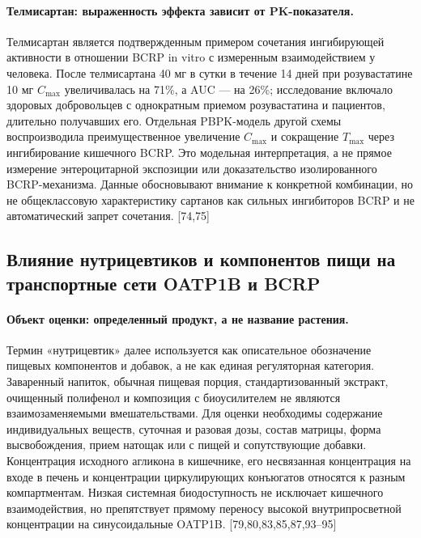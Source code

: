 \documentclass[11pt]{article}
\begin{document}
\paragraph{Телмисартан: выраженность эффекта зависит от PK-показателя.}
Телмисартан является подтвержденным примером сочетания ингибирующей активности в отношении BCRP in vitro с измеренным взаимодействием у человека. После телмисартана 40 мг в сутки в течение 14 дней при розувастатине 10 мг \(C_{\max}\) увеличивалась на 71\%, а AUC --- на 26\%; исследование включало здоровых добровольцев с однократным приемом розувастатина и пациентов, длительно получавших его. Отдельная PBPK-модель другой схемы воспроизводила преимущественное увеличение \(C_{\max}\) и сокращение \(T_{\max}\) через ингибирование кишечного BCRP. Это модельная интерпретация, а не прямое измерение энтероцитарной экспозиции или доказательство изолированного BCRP-механизма. Данные обосновывают внимание к конкретной комбинации, но не общеклассовую характеристику сартанов как сильных ингибиторов BCRP и не автоматический запрет сочетания. [74,75]

\subsection{Влияние нутрицевтиков и компонентов пищи на транспортные сети OATP1B и BCRP}

\paragraph{Объект оценки: определенный продукт, а не название растения.}
Термин «нутрицевтик» далее используется как описательное обозначение пищевых компонентов и добавок, а не как единая регуляторная категория. Заваренный напиток, обычная пищевая порция, стандартизованный экстракт, очищенный полифенол и композиция с биоусилителем не являются взаимозаменяемыми вмешательствами. Для оценки необходимы содержание индивидуальных веществ, суточная и разовая дозы, состав матрицы, форма высвобождения, прием натощак или с пищей и сопутствующие добавки. Концентрация исходного агликона в кишечнике, его несвязанная концентрация на входе в печень и концентрации циркулирующих конъюгатов относятся к разным компартментам. Низкая системная биодоступность не исключает кишечного взаимодействия, но препятствует прямому переносу высокой внутрипросветной концентрации на синусоидальные OATP1B. [79,80,83,85,87,93--95]
\end{document}
